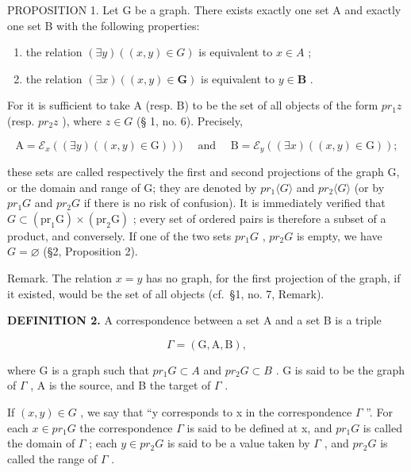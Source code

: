 PROPOSITION 1. Let G be a graph. There exists exactly one set A and exactly one set B with the following properties:

\begin{enumerate}
\def\labelenumi{(\arabic{enumi})}
\item
  the relation \((\exists y)((x, y) \in G)\) is equivalent to \(x \in A\) ;
\item
  the relation \((\exists x)((x, y) \in \mathbf{G})\) is equivalent to \(y \in \mathbf{B}\) .
\end{enumerate}

For it is sufficient to take A (resp. B) to be the set of all objects of the form \(pr_{1}z\) (resp. \(pr_{2}z\) ), where \(z \in G\) (§ 1, no. 6). Precisely,

\[
\mathrm{A} = \mathcal {E} _ {x} ((\exists y) ((x, y) \in \mathrm{G}))) \quad \text { and } \quad \mathrm{B} = \mathcal {E} _ {y} ((\exists x) ((x, y) \in \mathrm{G}));
\]

these sets are called respectively the first and second projections of the graph G, or the domain and range of G; they are denoted by \(pr_{1}\langle G\rangle\) and \(pr_{2}\langle G\rangle\) (or by \(pr_{1}G\) and \(pr_{2}G\) if there is no risk of confusion). It is immediately verified that \(G\subset(\mathrm{pr}_{1}\mathrm{G})\times(\mathrm{pr}_{2}\mathrm{G})\) ; every set of ordered pairs is therefore a subset of a product, and conversely. If one of the two sets \(pr_{1}G\) , \(pr_{2}G\) is empty, we have \(G=\varnothing\) (§2, Proposition 2).

Remark. The relation \(x = y\) has no graph, for the first projection of the graph, if it existed, would be the set of all objects (cf.~§1, no. 7, Remark).

\textbf{DEFINITION 2.} A correspondence between a set A and a set B is a triple

\[
\Gamma = (\mathrm{G}, \mathrm{A}, \mathrm{B}),
\]

where G is a graph such that \(pr_{1}G \subset A\) and \(pr_{2}G \subset B\) . G is said to be the graph of \(\Gamma\) , A is the source, and B the target of \(\Gamma\) .

If \((x, y) \in G\) , we say that ``y corresponds to x in the correspondence \(\Gamma\) ''. For each \(x \in pr_{1}G\) the correspondence \(\Gamma\) is said to be defined at x, and \(pr_{1}G\) is called the domain of \(\Gamma\) ; each \(y \in pr_{2}G\) is said to be a value taken by \(\Gamma\) , and \(pr_{2}G\) is called the range of \(\Gamma\) .

